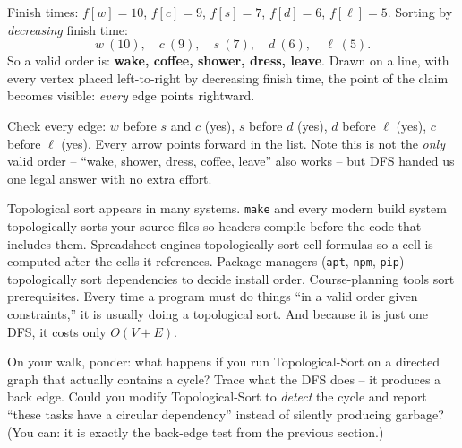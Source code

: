 Finish times: $f[w]=10$, $f[c]=9$, $f[s]=7$, $f[d]=6$, $f[\ell]=5$. Sorting by
\emph{decreasing} finish time:
\[
w\ (10),\quad c\ (9),\quad s\ (7),\quad d\ (6),\quad \ell\ (5).
\]
So a valid order is: \textbf{wake, coffee, shower, dress, leave}. Drawn on a
line, with every vertex placed left-to-right by decreasing finish time, the
point of the claim becomes visible: \emph{every} edge points rightward.

\begin{center}
\end{center}

Check every
edge: $w$ before $s$ and $c$ (yes), $s$ before $d$ (yes), $d$ before $\ell$
(yes), $c$ before $\ell$ (yes). Every arrow points forward in the list. Note
this is not the \emph{only} valid order -- ``wake, shower, dress, coffee,
leave'' also works -- but DFS handed us one legal answer with no extra effort.

\begin{aestheticbox}
Topological sort appears in many systems. \texttt{make} and every modern
build system topologically sorts your source files so headers compile before the
code that includes them. Spreadsheet engines topologically sort cell formulas so
a cell is computed after the cells it references. Package managers
(\texttt{apt}, \texttt{npm}, \texttt{pip}) topologically sort dependencies to
decide install order. Course-planning tools sort prerequisites. Every time a
program must do things ``in a valid order given constraints,'' it is usually
doing a topological sort. And because it is just one DFS, it costs only $O(V+E)$.
\end{aestheticbox}

\begin{walkbox}
On your walk, ponder: what happens if you run Topological-Sort on a directed
graph that actually contains a cycle? Trace what the DFS does -- it produces a
back edge. Could you modify Topological-Sort to \emph{detect} the cycle and report ``these tasks
have a circular dependency'' instead of silently producing garbage? (You can: it
is exactly the back-edge test from the previous section.)
\end{walkbox}

